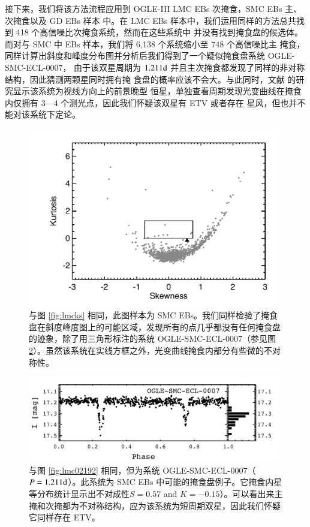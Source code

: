 接下来，我们将该方法流程应用到 OGLE-III LMC EBs 次掩食，SMC EBs 主、次掩食以及 GD EBs 样本
中。在 LMC EBs 样本中，我们运用同样的方法总共找到 418 个高信噪比次掩食系统，然而在这些系统中
并没有找到掩食盘的候选体。而对与 SMC 中 EBs 样本，我们将 6,138 个系统缩小至 748 个高信噪比主
掩食，同样计算出斜度和峰度分布图并分析后我们得到了一个疑似掩食盘系统 OGLE- SMC-ECL-0007，
由于该双星周期为 $1.211 \mathrm{d}$ 并且主次掩食都发现了同样的非对称结构，因此猜测两颗星同时拥有掩
食盘的概率应该不会大。与此同时，文献  的研究显示该系统为视线方向上的前景晚型
恒星，单独查看周期发现光变曲线在掩食内仅拥有 3---4 个测光点，因此我们怀疑该双星有 ETV 或者存在
星风，但也并不能对该系统下定论。

\begin{figure}[t]
\centering
\includegraphics[width=0.98\textwidth,trim={0.4in 0.2in 0 0}]{figures/chapter3/f11_smcks.pdf}
\caption{与图 \ref{fig:lmcks} 相同，此图样本为 SMC EBs。我们同样检验了掩食盘在斜度峰度图上的可能区域，发现所有的点几乎都没有任何掩食盘的迹象，除了用三角形标注的系统 OGLE-SMC-ECL-0007（参见图 \ref{fig:smc0007}）。虽然该系统在实线方框之外，光变曲线掩食内部分有些微的不对称性。}
\label{fig:smcks}
\end{figure}


\begin{figure}[t]
\centering
\includegraphics[width=0.98\textwidth,trim={0.0in 0.2in 0 0}]{figures/chapter3/f12_smc0007.pdf}
\caption{与图 \ref{fig:lmc02192} 相同，但为系统 OGLE-SMC-ECL-0007（$P = 1.211 \mathrm{d}$）。此系统为 SMC EBs 中可能的掩食盘例子。它掩食内星等分布统计显示出不对成性$S=0.57$ and $K=-0.15$）。可以看出来主掩和次掩都为不对称结构，应为该系统为短周期双星，因此我们怀疑它同样存在 ETV。}
\label{fig:smc0007}
\end{figure}

